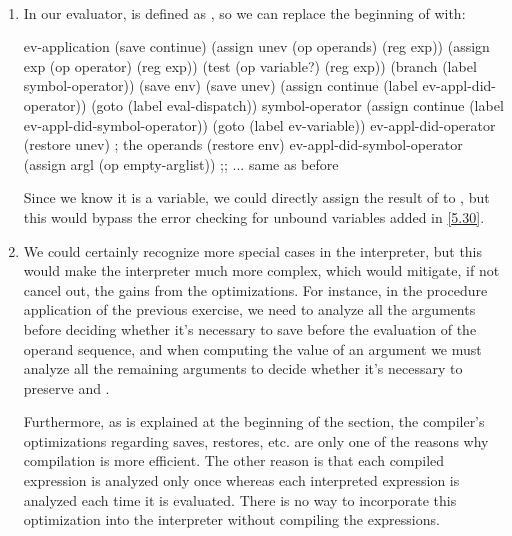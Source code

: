 \begin{exe}[5.32]
    \label{5.32}
    \ \vspace{-20pt}
    \begin{enumerate}
	\item In our evaluator,  is defined as , 
	    so we can replace the beginning of  with:
            \begin{cscm}
                ev-application
                    (save continue)
                    (assign unev (op operands) (reg exp))
                    (assign exp (op operator) (reg exp))
                    (test (op variable?) (reg exp))
                    (branch (label symbol-operator))
                    (save env)
                    (save unev)
                    (assign continue (label ev-appl-did-operator))
                    (goto (label eval-dispatch))
                symbol-operator
                    (assign continue (label ev-appl-did-symbol-operator))
                    (goto (label ev-variable))
                ev-appl-did-operator
                    (restore unev)          ; the operands
                    (restore env)
                ev-appl-did-symbol-operator
                    (assign argl (op empty-arglist))
                ;; ... same as before
            \end{cscm}
            Since we know it is a variable, we could directly assign the result 
            of  to , but this would bypass 
            the error checking for unbound variables added in \autoref{5.30}.
        \item We could certainly recognize more special cases in the 
            interpreter, but this would make the interpreter much more complex, 
            which would mitigate, if not cancel out, the gains from the 
            optimizations. For instance, in the procedure application of the 
            previous exercise, we need to analyze all the arguments before 
            deciding whether it’s necessary to save  before the 
            evaluation of the operand sequence, and when computing the value of 
            an argument we must analyze all the remaining arguments to decide 
            whether it’s necessary to preserve  and .

            Furthermore, as is explained at the beginning of the section, the 
            compiler’s optimizations regarding saves, restores, etc. are only 
            one of the reasons why compilation is more efficient. The other 
            reason is that each compiled expression is analyzed only once 
            whereas each interpreted expression is analyzed each time it is 
            evaluated. There is no way to incorporate this optimization into the 
            interpreter without compiling the expressions.
    \end{enumerate}
\end{exe}

